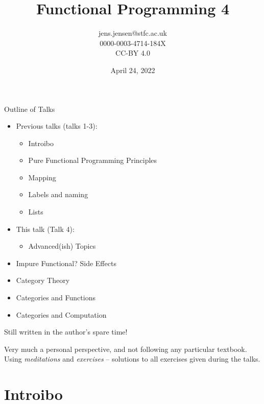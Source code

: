 \documentclass[presentation]{beamer}
\author{jens.jensen@stfc.ac.uk \\0000-0003-4714-184X\\CC-BY 4.0}
\date{April 24, 2022}
\title{Functional Programming 4}
\begin{document}
\maketitle
\begin{frame}{Outline of Talks}

  \begin{itemize}
    \item Previous talks (talks 1-3):
    \begin{itemize}
\item Introibo
\item Pure Functional Programming Principles
    \item Mapping
    \item Labels and naming
    \item Lists
    \end{itemize}
  \item This talk (Talk 4):
    \begin{itemize}
    \item Advanced(ish) Topics
    \end{itemize}
\item Impure Functional? Side Effects
\item Category Theory
\item Categories and Functions
\item Categories and Computation

  \end{itemize}
Still written in the author's spare time!

\medskip

Very much a personal perspective, and not following any particular textbook.  Using \emph{meditations} and \emph{exercises} -- solutions to all exercises given during the talks.

\end{frame}


\section{Introibo}
\label{sec:org0edb596}
\end{document}
